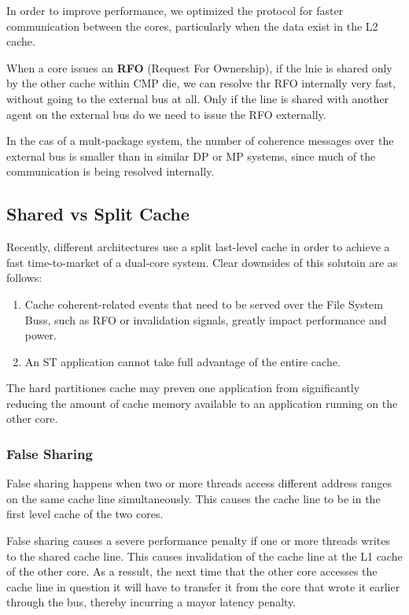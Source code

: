 In order to improve performance, we optimized the protocol for faster communication between the cores, particularly when the data exist in the L2 cache.

When a core issues an \textbf{RFO} (Request For Ownership), if the lnie is shared only by the other cache within CMP die, we can resolve thr RFO internally very fast, without going to the external bus at all. Only if the line is shared with another agent on the external bus do we need to issue the RFO externally.

In the cas of a mult-package system, the number of coherence messages over the external bus is smaller than in similar DP or MP systems, since much of the communication is being resolved internally.

\subsection{Shared vs Split Cache}
Recently, different architectures use a split last-level cache in order to achieve a fast time-to-market of a dual-core system. Clear downsides of this solutoin are as follows:
\begin{enumerate}
	\item Cache coherent-related events that need to be served over the File System Buss, such as RFO or invalidation signals, greatly impact performance and power.
	\item An ST application cannot take full advantage of the entire cache.
\end{enumerate}

The hard partitiones cache may preven one application from significantly reducing the amount of cache memory available to an application running on the other core.

\subsubsection{False Sharing}
False sharing happens when two or more threads access different address ranges on the same cache line simultaneously. This causes the cache line to be in the first level cache of the two cores.

False sharing causes a severe performance penalty if one or more threads writes to the shared cache line. This causes invalidation of the cache line at the L1 cache of the other core. As a ressult, the next time that the other core accesses the cache line in question it will have to transfer it from the core that wrote it earlier through the bus, thereby incurring a mayor latency penalty.

